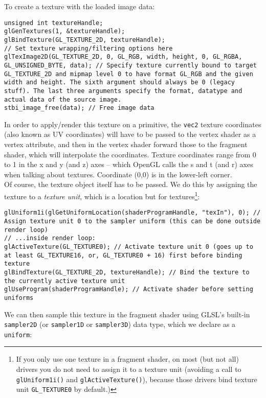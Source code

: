 \documentclass[8pt, table, xcdraw]{article}%
\begin{document}
To create a texture with the loaded image data:

\begin{lstlisting}
unsigned int textureHandle;
glGenTextures(1, &textureHandle);
glBindTexture(GL_TEXTURE_2D, textureHandle);
// Set texture wrapping/filtering options here
glTexImage2D(GL_TEXTURE_2D, 0, GL_RGB, width, height, 0, GL_RGBA, GL_UNSIGNED_BYTE, data); // Specify texture currently bound to target GL_TEXTURE_2D and mipmap level 0 to have format GL_RGB and the given width and height. The sixth argument should always be 0 (legacy stuff). The last three arguments specify the format, datatype and actual data of the source image.
stbi_image_free(data); // Free image data
\end{lstlisting}

In order to apply/render this texture on a primitive, the \lstinline{vec2} texture coordinates (also known as UV coordinates) will have to be passed to the vertex shader as a vertex attribute, and then in the vertex shader forward those to the fragment shader, which will interpolate the coordinates. Texture coordinates range from 0 to 1 in the x and y (and z) axes -- which OpenGL calls the s and t (and r) axes when talking about textures. Coordinate (0,0) is in the lower-left corner.\\
Of course, the texture object itself has to be passed. We do this by assigning the texture to a \emph{texture unit}, which is a location but for textures\footnote{If you only use one texture in a fragment shader, on most (but not all) drivers you do not need to assign it to a texture unit (avoiding a call to \lstinline{glUniform1i()} and \lstinline{glActiveTexture()}), because those drivers bind texture unit \lstinline{GL_TEXTURE0} by default.)}:

\begin{lstlisting}
glUniform1i(glGetUniformLocation(shaderProgramHandle, "texIn"), 0); // Assign texture unit 0 to the sampler uniform (this can be done outside render loop)
// ...inside render loop:
glActiveTexture(GL_TEXTURE0); // Activate texture unit 0 (goes up to at least GL_TEXTURE16, or, GL_TEXTURE0 + 16) first before binding texture
glBindTexture(GL_TEXTURE_2D, textureHandle); // Bind the texture to the currently active texture unit
glUseProgram(shaderProgramHandle); // Activate shader before setting uniforms
\end{lstlisting}

We can then sample this texture in the fragment shader using GLSL's built-in \lstinline{sampler2D} (or \lstinline{sampler1D} or \lstinline{sampler3D}) data type, which we declare as a \lstinline{uniform}:
\end{document}
